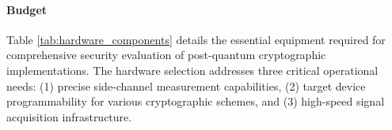 \documentclass[11pt, a4paper]{article}
\begin{document}



\paragraph{Budget}

Table \ref{tab:hardware_components} details the essential 
equipment required for comprehensive security evaluation of 
post-quantum cryptographic implementations. The hardware 
selection addresses three critical operational needs: 
(1) precise side-channel measurement capabilities, (2)
 target device programmability for various cryptographic schemes, 
 and (3) high-speed signal acquisition infrastructure.
\end{document}
